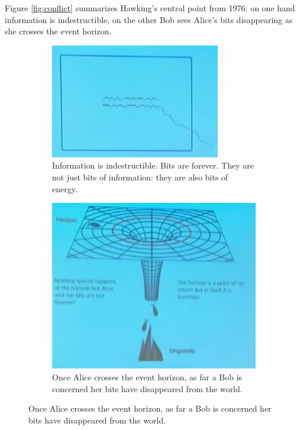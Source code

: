 \documentclass[]{article}
\begin{document}
{\begin{appendices}
	Figure \ref{fig:conflict} summarizes Hawking's central point from 1976: on one hand information is indestructible, on the other Bob sees Alice's bits disappearing as she crosses the event horizon.
	\begin{figure}[H]
		\caption{Conflict of principles: a paradox.}\label{fig:conflict}
		\begin{subfigure}[t]{0.45\textwidth}
			\caption{Information is indestructible. Bits are forever. They are not just bits of information: they are also bits of energy.}
			\includegraphics[width=\textwidth]{wh-kcwc-1st}
		\end{subfigure}
		\;
		\begin{subfigure}[t]{0.45\textwidth}
			\caption{Once Alice crosses the event horizon, as far a Bob is concerned her bits have disappeared from the world.}
			\includegraphics[width=\textwidth]{wh-black-hole}
		\end{subfigure}
	\end{figure}


\end{appendices}}
\end{document}
